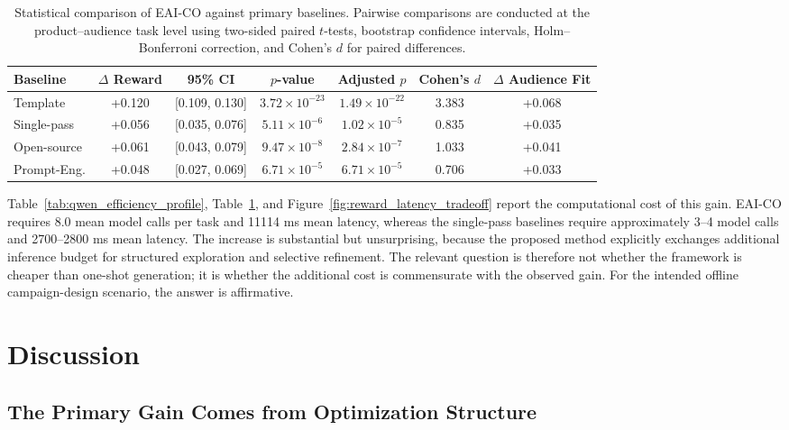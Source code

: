 \documentclass[applsci,article,submit,pdftex,moreauthors]{Definitions/mdpi}
\newcommand{\SummaryTableStyle}{\small\setlength{\tabcolsep}{7pt}\renewcommand{\arraystretch}{1.24}}
\begin{document}
\begin{table}[H]
\caption{Statistical comparison of EAI-CO against primary baselines. Pairwise comparisons are conducted at the product--audience task level using two-sided paired $t$-tests, bootstrap confidence intervals, Holm--Bonferroni correction, and Cohen's $d$ for paired differences.}
\label{tab:significance_cost}
\centering
\SummaryTableStyle
{}
\begin{adjustbox}{max width=\textwidth}
\begin{tabular}{lcccccc}
\toprule
\rowcolor{tableheader}
Baseline & $\Delta$ Reward & 95\% CI & $p$-value & Adjusted $p$ & Cohen's $d$ & $\Delta$ Audience Fit \\
\midrule
Template & +0.120 & [0.109, 0.130] & $3.72\times10^{-23}$ & $1.49\times10^{-22}$ & 3.383 & +0.068 \\
Single-pass & +0.056 & [0.035, 0.076] & $5.11\times10^{-6}$ & $1.02\times10^{-5}$ & 0.835 & +0.035 \\
Open-source & +0.061 & [0.043, 0.079] & $9.47\times10^{-8}$ & $2.84\times10^{-7}$ & 1.033 & +0.041 \\
Prompt-Eng. & +0.048 & [0.027, 0.069] & $6.71\times10^{-5}$ & $6.71\times10^{-5}$ & 0.706 & +0.033 \\
\bottomrule
\end{tabular}
\end{adjustbox}
\end{table}

Table~\ref{tab:qwen_efficiency_profile}, Table~\ref{tab:significance_cost}, and Figure~\ref{fig:reward_latency_tradeoff} report the computational cost of this gain. EAI-CO requires 8.0 mean model calls per task and 11114 ms mean latency, whereas the single-pass baselines require approximately 3--4 model calls and 2700--2800 ms mean latency. The increase is substantial but unsurprising, because the proposed method explicitly exchanges additional inference budget for structured exploration and selective refinement. The relevant question is therefore not whether the framework is cheaper than one-shot generation; it is whether the additional cost is commensurate with the observed gain. For the intended offline campaign-design scenario, the answer is affirmative.

\section{Discussion}

\subsection{The Primary Gain Comes from Optimization Structure}
\end{document}
